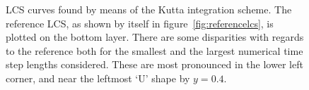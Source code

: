 \begin{figure}[htpb]
    \centering
    
    \caption[LCS curves found by means of the Kutta integration scheme]{
        LCS curves found by means of the Kutta integration scheme. The
        reference LCS, as shown by itself in figure~\ref{fig:referencelcs},
        is plotted on the bottom layer. There are some disparities with
        regards to the reference both for the smallest and the largest numerical
        time step lengths considered. These are most pronounced in the lower
        left corner, and near the leftmost `U' shape by $y=0.4$.}
    \label{fig:lcs_rk3}
\end{figure}
